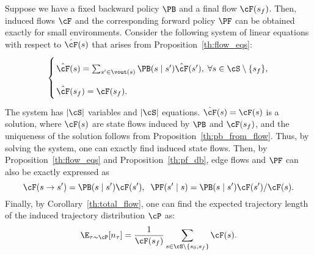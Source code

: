 Suppose we have a fixed backward policy $\PB$ and a final flow $\cF(s_f)$. Then, induced flows $\cF$ and the corresponding forward policy $\PF$ can be obtained exactly for small environments. Consider the following system of linear equations with respect to $\hat{\cF}(s)$ that arises from Proposition~\ref{th:flow_eqs}:
\begin{equation}\label{eq:state_flow_system}
\left\{
\arraycolsep=1.5pt\def\arraystretch{2.2}
\begin{array}{l}
\hat{\cF}(s) = \sum_{s' \in \vout(s)} \PB(s \mid s')\hat{\cF}(s'), \; \forall s \in \cS \setminus \{s_f\}, \\
\hat{\cF}(s_f) = \cF(s_f).
\end{array}
\right.
\end{equation}
The system has $|\cS|$ variables and $|\cS|$ equations. $\hat{\cF}(s) = \cF(s)$ is a solution, where $\cF(s)$ are state flows induced by $\PB$ and $\cF(s_f)$, and the uniqueness of the solution follows from Proposition~\ref{th:pb_from_flow}. Thus, by solving the system, one can exactly find induced state flows. Then, by Proposition~\ref{th:flow_eqs} and Proposition~\ref{th:pf_db}, edge flows and $\PF$ can also be exactly expressed as
$$
\cF(s \to s') = \PB(s \mid s')\cF(s'), \;\; \PF(s' \mid s) = \PB(s \mid s')\cF(s') / \cF(s).
$$
Finally, by Corollary~\ref{th:total_flow}, one can find the expected trajectory length of the induced trajectory distribution $\cP$ as:
$$
    \E_{\tau \sim \cP}[n_\tau] = \frac{1}{\cF(s_f)}\sum\limits_{s \in \cS \setminus \{s_0, s_f\}} \cF(s).
$$

